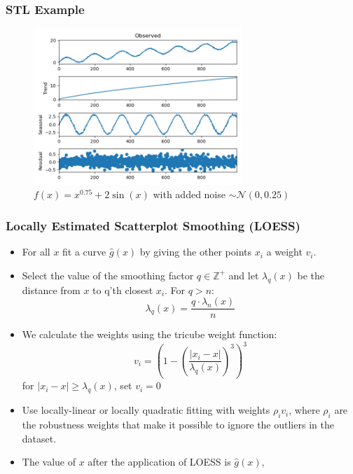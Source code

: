 \documentclass[9pt]{beamer}
\begin{document}
\begin{frame}
  \frametitle{STL Example}
  \begin{figure}[H]
    \centering
    \includegraphics[width=0.7\textwidth]{imgs/stl1.png}
    \caption{$f(x) = x^{0.75} + 2\sin(x)$ with added noise
      $\sim \mathcal{N}(0, 0.25)$}
  \end{figure}
  \centering
\end{frame}


\begin{frame}
\frametitle{Locally Estimated Scatterplot Smoothing (LOESS)}
\begin{itemize}
  \item For all $x$ fit a curve $\hat{g}(x)$ by giving the other points $x_i$ a
  weight $v_i$.
\item Select the value of the smoothing factor $q \in \mathbb{Z}^+$ and let
  $\lambda_q(x)$ be the distance from $x$ to q'th closest $x_i$. For $q > n$:
  \[
  \lambda_q(x) = \frac{q \cdot \lambda_n(x)}{n}
  \]
\item We calculate the weights using the tricube weight function:
  \[
  v_i = \left( 1 - \left( \frac{| x_i - x |}{\lambda_q(x)}  \right)^3\right)^3
  \]
  for $| x_i - x | \geq \lambda_q(x)$, set $v_i = 0$
\item Use locally-linear or locally quadratic fitting with weights
  $\rho_i v_i$, where $\rho_i$ are the robustness weights that make it possible to 
  ignore the outliers in the dataset.
\item The value of $x$ after the application of LOESS is $\hat{g}(x)$,
\end{itemize}
\end{frame}
\end{document}
